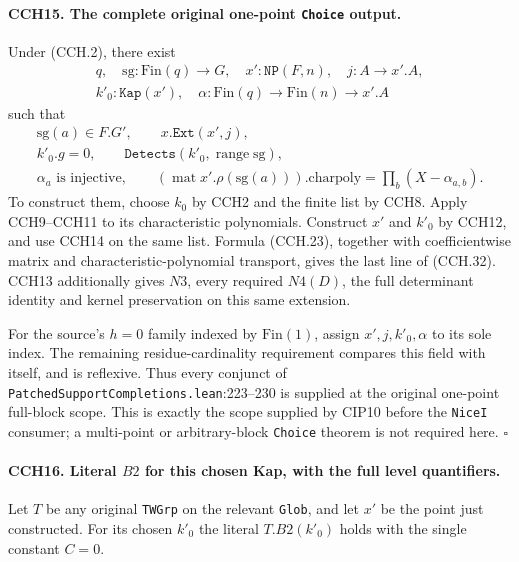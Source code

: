 \paragraph{CCH15. The complete original one-point \texttt{Choice} output.}
\label{claim:CCH15}
Under (CCH.2), there exist
\[
 \begin{gathered}
 q,\quad \mathrm{sg}:\mathrm{Fin}(q)\to G,\quad
 x':\texttt{NP}(F,n),\quad j:A\to x'.A,\\
 k'_0:\texttt{Kap}(x'),\quad
 \alpha:\mathrm{Fin}(q)\to\mathrm{Fin}(n)\to x'.A
 \end{gathered}
\]
such that
\[
 \begin{gathered}
 \mathrm{sg}(a)\in F.G',\qquad x.\texttt{Ext}(x',j),\\
 k'_0.g=0,\qquad \texttt{Detects}(k'_0,\operatorname{range}\mathrm{sg}),\\
 \alpha_a\text{ is injective},\qquad
 (\operatorname{mat}x'.\rho(\mathrm{sg}(a))).\mathrm{charpoly}
                  =\prod_b(X-\alpha_{a,b}).
 \end{gathered}
 \tag{CCH.32}
\]
To construct them, choose $k_0$ by CCH2 and the finite list by
CCH8.  Apply CCH9--CCH11 to its characteristic polynomials.
Construct $x'$ and $k'_0$ by CCH12, and use CCH14 on the
same list.  Formula (CCH.23), together with coefficientwise
matrix and characteristic-polynomial transport, gives the
last line of (CCH.32).  CCH13 additionally gives $N3$, every
required $N4(D)$, the full determinant identity and kernel
preservation on this same extension.

For the source's $h=0$ family indexed by $\mathrm{Fin}(1)$,
assign $x',j,k'_0,\alpha$ to its sole index.  The remaining
residue-cardinality requirement compares this field with
itself, and is reflexive.  Thus every conjunct of
\nolinkurl{PatchedSupportCompletions.lean}:223--230 is
supplied at the original one-point full-block scope.
This is exactly the scope supplied by CIP10 before the
\texttt{NiceI} consumer; a multi-point or arbitrary-block
\texttt{Choice} theorem is not required here.
\hfill$\square$

\paragraph{CCH16. Literal $B2$ for this chosen Kap, with the full level quantifiers.}
\label{claim:CCH16}
Let $T$ be any original \texttt{TWGrp} on the relevant
\texttt{Glob}, and let $x'$ be the point just constructed.
For its chosen $k'_0$ the literal $T.B2(k'_0)$ holds with
the single constant $C=0$.

